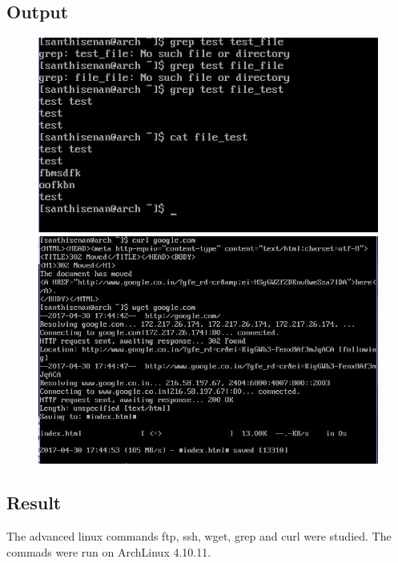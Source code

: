 \documentclass{article}
\begin{document}
\subsection{Output}
\newpage
\begin{figure}[h!]
	\includegraphics[width=\linewidth]{./outputs/advlin1.jpg}
	\includegraphics[width=\linewidth]{./outputs/advlinux.jpg}
\end{figure}	
\newpage

\subsection{Result}
The advanced linux commands ftp, ssh, wget, grep and curl were studied. The commads were run on ArchLinux 4.10.11.

\begin{refsection}
\cite{ftpweb1}
\cite{ftpweb2}
\cite{curlweb}
\cite{wgetweb}
\cite{grepweb}
\printbibliography

\end{refsection}
\end{document}
